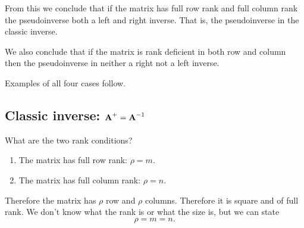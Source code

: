 From this we conclude that if the matrix has full row rank and full column rank the pseudoinverse both a left and right inverse. That is, the pseudoinverse in the classic inverse.

We also conclude that if the matrix is rank deficient in both row and column then the pseudoinverse in neither a right not a left inverse.

Examples of all four cases follow.

\subsection{Classic inverse: $\operatorname{\textbf{A}^{\mathrm{+}}} = \textbf{A}^{\mathrm{-1}}$}
What are the two rank conditions?
\begin{enumerate}
\item The matrix has full row rank: $\rho = m$.
\item The matrix has full column rank: $\rho = n$.
\end{enumerate}
Therefore the matrix has $\rho$ row and $\rho$ columns. Therefore it is square and of full rank. We don't know what the rank is or what the size is, but we can state
\begin{equation}
  \rho = m = n.
\end{equation}

